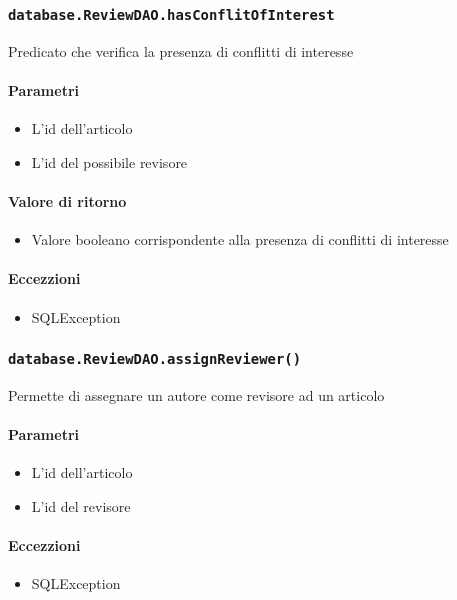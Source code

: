 \subsubsection{\texttt{database.ReviewDAO.hasConflitOfInterest}}
Predicato che verifica la presenza di conflitti di interesse
\paragraph{Parametri}
\begin{itemize}
\item L'id dell'articolo
\item L'id del possibile revisore
\end{itemize}
\paragraph{Valore di ritorno}
\begin{itemize}
\item Valore booleano corrispondente alla presenza di conflitti di interesse
\end{itemize}
\paragraph{Eccezzioni}
\begin{itemize}
  \item SQLException
\end{itemize}

\subsubsection{\texttt{database.ReviewDAO.assignReviewer()}}
Permette di assegnare un autore come revisore ad un articolo
\paragraph{Parametri}
\begin{itemize}
\item L'id dell'articolo
\item L'id del revisore
\end{itemize}
\paragraph{Eccezzioni}
\begin{itemize}
  \item SQLException
\end{itemize}

